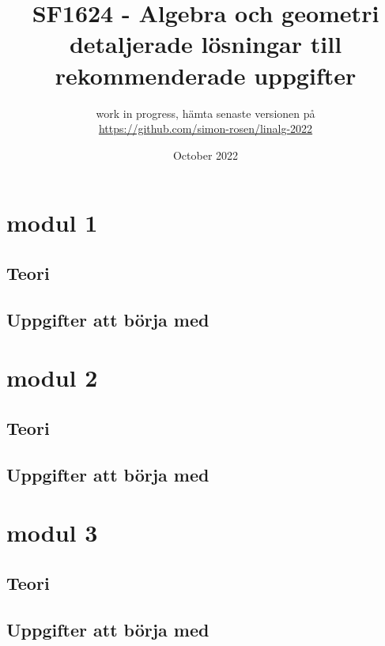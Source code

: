 \documentclass{article}
\title{SF1624 - Algebra och geometri\\ {\large detaljerade lösningar till rekommenderade uppgifter}}
\author{work in progress, hämta senaste versionen på\\ \url{https://github.com/simon-rosen/linalg-2022}}
\date{October 2022}
\begin{document}
\maketitle
\tableofcontents
\section{modul 1}


\subsection{Teori}


\subsection{Uppgifter att börja med}


\section{modul 2}
\subsection{Teori}


\subsection{Uppgifter att börja med}


\section{modul 3}
\subsection{Teori}


\subsection{Uppgifter att börja med}
\end{document}

